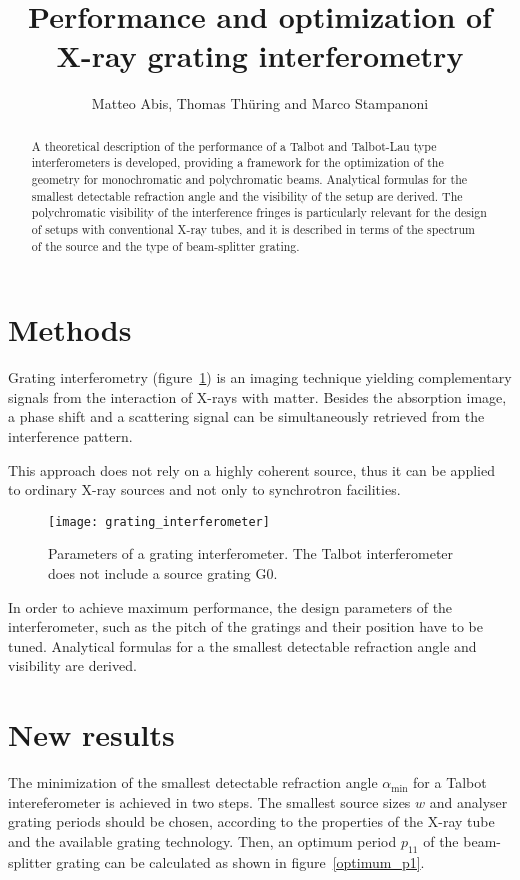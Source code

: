 \documentclass[a4paper]{article}
\begin{document}
\title{Performance and optimization of X-ray grating interferometry}
\author{Matteo Abis, Thomas Th\"uring and Marco Stampanoni}
\renewcommand{\today}{}
\maketitle
\begin{abstract}
A theoretical description of the performance of a Talbot and Talbot-Lau
type interferometers is developed, providing a framework for the
optimization of the geometry for monochromatic and polychromatic
beams. Analytical formulas for the smallest
detectable refraction angle and the visibility of the setup are derived.
The polychromatic visibility of the interference fringes is particularly
relevant for the design of setups with conventional X-ray tubes, and it
is described in terms of the spectrum of the source and the type of
beam-splitter grating.
\end{abstract}
\section{Methods}
Grating interferometry (figure~\ref{interferometer}) is an imaging technique yielding complementary
signals from the interaction of X-rays with matter. Besides the absorption
image, a phase shift \cite{phase,phase2} and a scattering \cite{scattering} signal
can be simultaneously retrieved from the interference pattern.

This approach does not rely on a highly coherent source, thus it can be applied
to ordinary X-ray sources and not only to synchrotron facilities.

\begin{figure}[h]
    \centering
    \texttt{[image: grating\_interferometer]}
    \caption{Parameters of a grating interferometer. The Talbot
    interferometer does not include a source grating G0.}
    \label{interferometer}
\end{figure}

In order to achieve maximum performance, the design parameters of the
interferometer, such as the pitch of the gratings and their position have to
be tuned. Analytical formulas for a the smallest detectable refraction angle
and visibility are derived.

\section{New results}
The minimization of the smallest detectable refraction angle 
$\alpha_\text{min}$\cite{alphamin} for a Talbot intereferometer is achieved in two steps.
The smallest source sizes $w$ and analyser grating periods should be chosen,
according to the properties of the X-ray tube and the available grating
technology. Then, an optimum period $p_{11}$ of the beam-splitter grating can be
calculated as shown in figure~\ref{optimum_p1}.
\end{document}
